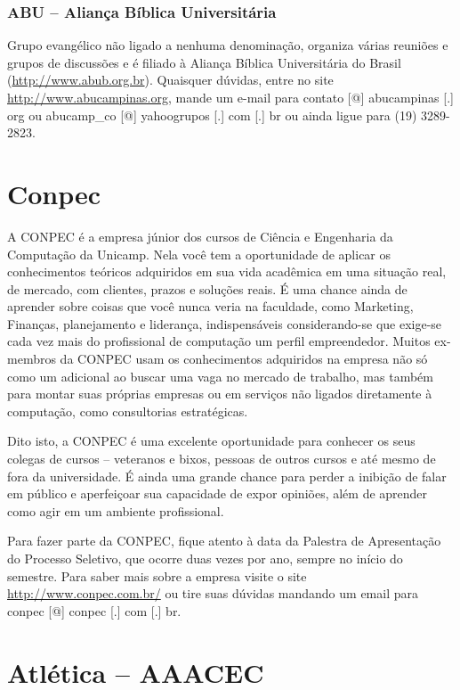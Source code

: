 \subsubsection{ABU -- Aliança Bíblica Universitária}

Grupo evangélico não ligado a nenhuma denominação, organiza várias reuniões
e grupos de discussões e é filiado à Aliança Bíblica Universitária do Brasil
(\url{http://www.abub.org.br}). Quaisquer dúvidas, entre no site
\url{http://www.abucampinas.org}, mande um e-mail para contato [@] abucampinas
[.] org ou abucamp\_co [@] yahoogrupos [.] com [.] br ou ainda ligue para (19)
3289-2823.

\section{Conpec}

A CONPEC é a empresa júnior dos cursos de Ciência e Engenharia da Computação da
Unicamp. Nela você tem a oportunidade de aplicar os conhecimentos teóricos
adquiridos em sua vida acadêmica em uma situação real, de mercado, com clientes,
prazos e soluções reais. É uma chance ainda de aprender sobre coisas que você
nunca veria na faculdade, como Marketing, Finanças, planejamento e liderança,
indispensáveis considerando-se que exige-se cada vez mais do profissional de
computação um perfil empreendedor. Muitos ex-membros da CONPEC usam os
conhecimentos adquiridos na empresa não só como um adicional ao buscar uma vaga
no mercado de trabalho, mas também para montar suas próprias empresas ou em
serviços não ligados diretamente à computação, como consultorias estratégicas.

Dito isto, a CONPEC é uma excelente oportunidade para conhecer os seus colegas
de cursos -- veteranos e bixos, pessoas de outros cursos e até mesmo de fora da
universidade. É ainda uma grande chance para perder a inibição de falar em
público e aperfeiçoar sua capacidade de expor opiniões, além de aprender como
agir em um ambiente profissional.

Para fazer parte da CONPEC, fique atento à data da Palestra de Apresentação do
Processo Seletivo, que ocorre duas vezes por ano, sempre no início do semestre.
Para saber mais sobre a empresa visite o site \url{http://www.conpec.com.br/} ou
tire suas dúvidas mandando um email para conpec [@] conpec [.] com [.] br.

\section{Atlética -- AAACEC}

